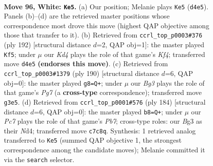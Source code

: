 \documentclass[11pt]{article}
\begin{document}
\clearpage

\begin{figure}[p]\centering
\begin{subfigure}{0.46\textwidth}\centering
\resizebox{\linewidth}{!}{%
\newchessgame
\chessboard[
  setfen={6k1/2P5/8/8/3K4/6B1/8/8 w - - 17 96},
  showmover=false,
  pgfstyle=straightmove, color=movearrow, markmove={d4-e5}
]}
\caption{}
\end{subfigure}\hfill
\begin{subfigure}{0.46\textwidth}\centering
\resizebox{\linewidth}{!}{%
\newchessgame
\chessboard[
  setfen={6k1/8/6P1/8/5K2/3B4/8/8 w - - 3 97},
  showmover=false,
  pgfstyle=straightmove, color=movearrow, markmove={f4-f5}
]}
\caption{}
\end{subfigure}
\\[4pt]
\begin{subfigure}{0.46\textwidth}\centering
\resizebox{\linewidth}{!}{%
\newchessgame
\chessboard[
  setfen={8/6PK/4k3/8/8/8/8/8 w - - 3 96},
  showmover=false,
  pgfstyle=straightmove, color=movearrow, markmove={g7-g8}
]}
\caption{}
\end{subfigure}\hfill
\begin{subfigure}{0.46\textwidth}\centering
\resizebox{\linewidth}{!}{%
\newchessgame
\chessboard[
  setfen={8/KP6/3k4/8/3N4/8/8/8 w - - 3 93},
  showmover=false,
  pgfstyle=straightmove, color=movearrow, markmove={b7-b8}
]}
\caption{}
\end{subfigure}
\caption{\textbf{Move 96, White: \texttt{Ke5}.} (a) Our position; Melanie plays \texttt{Ke5} (\texttt{d4e5}). Panels (b)--(d) are the retrieved master positions whose correspondence most drove this move (highest QAP objective among those that transfer to it). (b) Retrieved from \texttt{ccrl\_top\_p0003\#376} (ply 192) [structural distance $d$=2, QAP obj=1]: the master played \texttt{Kf5}; under $\mu$ our \emph{Kd4} plays the role of that game's \emph{Kf4}; transferred move \texttt{d4e5} \textbf{(endorses this move)}. (c) Retrieved from \texttt{ccrl\_top\_p0003\#1379} (ply 190) [structural distance $d$=6, QAP obj=0]: the master played \texttt{g8=Q+}; under $\mu$ our \emph{Bg3} plays the role of that game's \emph{Pg7} (a \textbf{cross-type} correspondence); transferred move \texttt{g3e5}. (d) Retrieved from \texttt{ccrl\_top\_p0001\#576} (ply 184) [structural distance $d$=6, QAP obj=0]: the master played \texttt{b8=Q+}; under $\mu$ our \emph{Pc7} plays the role of that game's \emph{Pb7}; cross-type roles: our \emph{B}g3 as their \emph{N}d4; transferred move \texttt{c7c8q}. Synthesis: 1 retrieved analog transferred to \texttt{Ke5} (summed QAP objective 1, the strongest correspondence among the candidate moves); Melanie committed it via the \texttt{search} selector.}
\label{fig:thought-m190}
\end{figure}
\end{document}
